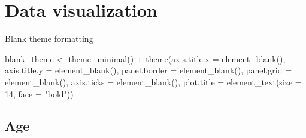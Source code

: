 \documentclass[
]{article}
\newenvironment{Shaded}{\begin{snugshade}}{\end{snugshade}}
\newcommand{\AttributeTok}[1]{\textcolor[rgb]{0.77,0.63,0.00}{#1}}
\newcommand{\DecValTok}[1]{\textcolor[rgb]{0.00,0.00,0.81}{#1}}
\newcommand{\FunctionTok}[1]{\textcolor[rgb]{0.00,0.00,0.00}{#1}}
\newcommand{\NormalTok}[1]{#1}
\newcommand{\OtherTok}[1]{\textcolor[rgb]{0.56,0.35,0.01}{#1}}
\newcommand{\SpecialCharTok}[1]{\textcolor[rgb]{0.00,0.00,0.00}{#1}}
\newcommand{\StringTok}[1]{\textcolor[rgb]{0.31,0.60,0.02}{#1}}
\begin{document}
\hypertarget{data-visualization}{%
\section{Data visualization}\label{data-visualization}}

Blank theme formatting

\begin{Shaded}
\begin{Highlighting}[]
\NormalTok{blank\_theme }\OtherTok{\textless{}{-}} \FunctionTok{theme\_minimal}\NormalTok{() }\SpecialCharTok{+} \FunctionTok{theme}\NormalTok{(}\AttributeTok{axis.title.x =} \FunctionTok{element\_blank}\NormalTok{(),}
    \AttributeTok{axis.title.y =} \FunctionTok{element\_blank}\NormalTok{(), }\AttributeTok{panel.border =} \FunctionTok{element\_blank}\NormalTok{(),}
    \AttributeTok{panel.grid =} \FunctionTok{element\_blank}\NormalTok{(), }\AttributeTok{axis.ticks =} \FunctionTok{element\_blank}\NormalTok{(),}
    \AttributeTok{plot.title =} \FunctionTok{element\_text}\NormalTok{(}\AttributeTok{size =} \DecValTok{14}\NormalTok{, }\AttributeTok{face =} \StringTok{"bold"}\NormalTok{))}
\end{Highlighting}
\end{Shaded}

\hypertarget{age}{%
\subsection{Age}\label{age}}
\end{document}

